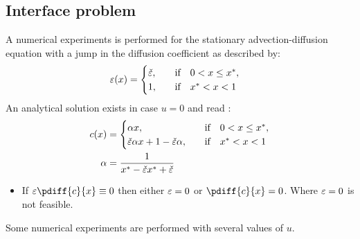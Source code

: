 \subsection{Interface problem}\label{sec:1d_numerical_interface_experiment}
A numerical experiments is performed for the stationary advection-diffusion equation with a jump in the diffusion coefficient as described by:
\begin{align}
    \varepsilon(x) &=
    \begin{cases}
        \check{\varepsilon}, & \quad \text{if} \quad 0 < x \leq x^*, \\
        1, & \quad \text{if} \quad x^* < x < 1
    \end{cases}
\end{align}
An analytical solution exists in case $u=0$ and read \citep[eq.\ 3.11]{Wesseling2001}:
\begin{align}
    c(x)& =
    \begin{cases}
        \alpha x, & \quad \text{if} \quad 0 < x \leq x^*, \\
        \check{\varepsilon}\alpha x + 1 - \check{\varepsilon}\alpha, & \quad \text{if} \quad x^*<x<1
    \end{cases} \\
    \alpha & = \frac{1}{x^* -\check{\varepsilon} x^* + \check{\varepsilon}}
\end{align}

\begin{itemize}
    \item If $\eps \pdiff{c}{x} \equiv 0$ then either $\varepsilon=0$ or $\pdiff{c}{x}=0$. Where $\varepsilon=0$ is not feasible.
\end{itemize}

Some numerical experiments are performed with several values of $u$.

